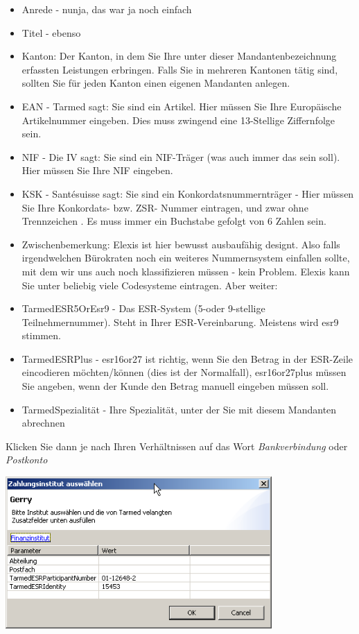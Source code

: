 \begin{itemize}



\item Anrede - nunja, das war ja noch einfach
\item Titel - ebenso
\item Kanton: Der Kanton, in dem Sie Ihre unter dieser Mandantenbezeichnung erfassten Leistungen erbringen. Falls Sie in mehreren Kantonen tätig sind, sollten Sie für jeden Kanton einen eigenen Mandanten anlegen.
\item EAN - Tarmed sagt: Sie sind ein Artikel. Hier müssen Sie Ihre Europäische
Artikelnummer eingeben. Dies muss zwingend eine 13-Stellige Ziffernfolge sein.
\item NIF - Die IV sagt: Sie sind ein NIF-Träger (was auch immer das sein soll). Hier müssen Sie Ihre NIF eingeben.
\item KSK - Santésuisse sagt: Sie sind ein Konkordatsnummernträger - Hier
müssen Sie Ihre Konkordats- bzw. ZSR- Nummer eintragen, und zwar ohne
Trennzeichen . Es muss immer ein Buchstabe gefolgt von 6 Zahlen sein.
\item Zwischenbemerkung: Elexis ist hier bewusst ausbaufähig designt. Also falls irgendwelchen Bürokraten noch
ein weiteres Nummernsystem einfallen sollte, mit dem wir uns auch noch
klassifizieren müssen - kein Problem. Elexis kann Sie unter beliebig viele Codesysteme eintragen. Aber weiter:
\item TarmedESR5OrEsr9 - Das ESR-System (5-oder 9-stellige Teilnehmernummer).
Steht in Ihrer ESR-Vereinbarung. Meistens wird esr9 stimmen.
\item TarmedESRPlus - esr16or27 ist richtig, wenn Sie den Betrag in der
ESR-Zeile eincodieren möchten/können (dies ist der Normalfall), esr16or27plus müssen Sie angeben,
wenn der Kunde den Betrag manuell eingeben müssen soll.
\item TarmedSpezialität - Ihre Spezialität, unter der Sie mit diesem Mandanten abrechnen
\end{itemize}
Klicken Sie dann je nach Ihren Verhältnissen auf das Wort  \textit{Bankverbindung}  oder  \textit{Postkonto}

\includegraphics[width=4in]{images/tarmed4.png}


